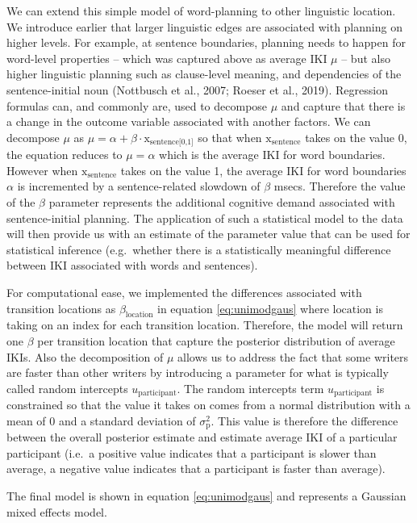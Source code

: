 \documentclass[
  english,
  man,floatsintext]{apa7}
\begin{document}
\begin{appendix}
We can extend this simple model of word-planning to other linguistic
location. We introduce earlier that larger linguistic edges are
associated with planning on higher levels. For example, at sentence
boundaries, planning needs to happen for word-level properties -- which
was captured above as average IKI \(\mu\) -- but also higher linguistic
planning such as clause-level meaning, and dependencies of the
sentence-initial noun (Nottbusch et al., 2007; Roeser et al., 2019).
Regression formulas can, and commonly are, used to decompose \(\mu\) and
capture that there is a change in the outcome variable associated with
another factors. We can decompose \(\mu\) as
\(\mu = \alpha + \beta \cdot \text{x}_\text{sentence[0,1]}\) so that
when \(\text{x}_\text{sentence}\) takes on the value 0, the equation
reduces to \(\mu = \alpha\) which is the average IKI for word
boundaries. However when \(\text{x}_\text{sentence}\) takes on the value
1, the average IKI for word boundaries \(\alpha\) is incremented by a
sentence-related slowdown of \(\beta\) msecs. Therefore the value of the
\(\beta\) parameter represents the additional cognitive demand
associated with sentence-initial planning. The application of such a
statistical model to the data will then provide us with an estimate of
the parameter value that can be used for statistical inference
(e.g.~whether there is a statistically meaningful difference between IKI
associated with words and sentences).

For computational ease, we implemented the differences associated with
transition locations as \(\beta_\text{location}\) in equation
\ref{eq:unimodgaus} where \(\text{location}\) is taking on an index for
each transition location. Therefore, the model will return one \(\beta\)
per transition location that capture the posterior distribution of
average IKIs. Also the decomposition of \(\mu\) allows us to address the
fact that some writers are faster than other writers by introducing a
parameter for what is typically called random intercepts
\(u_\text{participant}\). The random intercepts term
\(u_\text{participant}\) is constrained so that the value it takes on
comes from a normal distribution with a mean of 0 and a standard
deviation of \(\sigma_\text{p}^2\). This value is therefore the
difference between the overall posterior estimate and estimate average
IKI of a particular participant (i.e.~a positive value indicates that a
participant is slower than average, a negative value indicates that a
participant is faster than average).

The final model is shown in equation \ref{eq:unimodgaus} and represents
a Gaussian mixed effects model.


\end{appendix}
\end{document}
